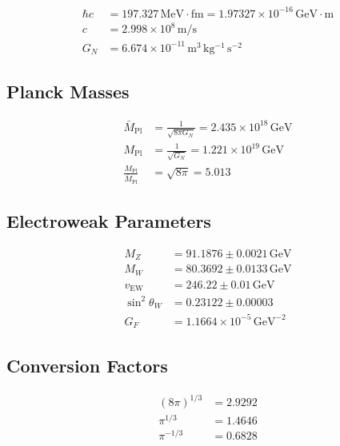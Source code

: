 \documentclass[11pt,a4paper]{article}
\newcommand{\Mpl}{\bar{M}_{\mathrm{Pl}}}
\newcommand{\MplOrig}{M_{\mathrm{Pl}}}
\newcommand{\MZ}{M_Z}
\newcommand{\MW}{M_W}
\newcommand{\vEW}{v_{\mathrm{EW}}}
\newcommand{\GeV}{\,\mathrm{GeV}}
\theoremstyle{definition}
\theoremstyle{plain}
\theoremstyle{remark}
\begin{document}
\begin{align}
\hbar c &= 197.327\,\mathrm{MeV}\cdot\mathrm{fm} = 1.97327 \times 10^{-16}\GeV\cdot\mathrm{m} \label{eq:app-hbarc} \\
c &= 2.998 \times 10^8\,\mathrm{m/s} \label{eq:app-c} \\
G_N &= 6.674 \times 10^{-11}\,\mathrm{m^3\,kg^{-1}\,s^{-2}} \label{eq:app-GN}
\end{align}

\subsection{Planck Masses}

\begin{align}
\Mpl &= \frac{1}{\sqrt{8\pi G_N}} = 2.435 \times 10^{18}\GeV \label{eq:app-Mpl-red} \\
\MplOrig &= \frac{1}{\sqrt{G_N}} = 1.221 \times 10^{19}\GeV \label{eq:app-Mpl-orig} \\
\frac{\MplOrig}{\Mpl} &= \sqrt{8\pi} = 5.013 \label{eq:app-Mpl-ratio}
\end{align}

\subsection{Electroweak Parameters}

\begin{align}
\MZ &= 91.1876 \pm 0.0021\GeV \label{eq:app-MZ} \\
\MW &= 80.3692 \pm 0.0133\GeV \label{eq:app-MW} \\
\vEW &= 246.22 \pm 0.01\GeV \label{eq:app-vEW} \\
\sin^2\theta_W &= 0.23122 \pm 0.00003 \label{eq:app-sin2thetaW} \\
G_F &= 1.1664 \times 10^{-5}\GeV^{-2} \label{eq:app-GF}
\end{align}

\subsection{Conversion Factors}

\begin{align}
(8\pi)^{1/3} &= 2.9292 \label{eq:app-8pi-third} \\
\pi^{1/3} &= 1.4646 \label{eq:app-pi-third} \\
\pi^{-1/3} &= 0.6828 \label{eq:app-pi-neg-third}
\end{align}
\end{document}

